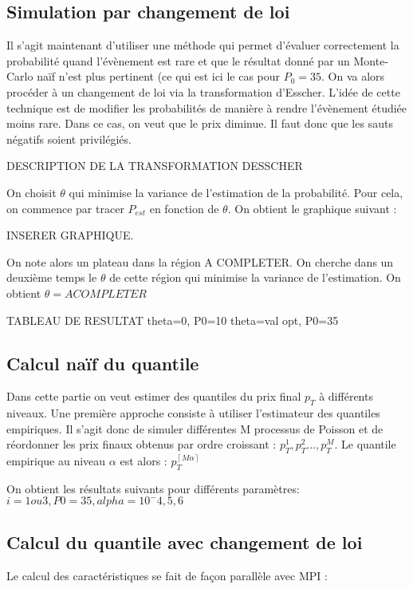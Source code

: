 \documentclass[a4paper,11pt]{article}
\begin{document}
\subsection{Simulation par changement de loi}

Il s'agit maintenant d'utiliser une méthode qui permet d'évaluer correctement la probabilité quand l'évènement est rare et que le résultat donné par un Monte-Carlo naïf n'est plus pertinent (ce qui est ici le cas pour $P_{0}=35$. On va alors procéder à un changement de loi via la transformation d'Esscher. L'idée de cette technique est de modifier les probabilités de manière à rendre l'évènement étudiée moins rare. Dans ce cas, on veut que le prix diminue. Il faut donc que les sauts négatifs soient privilégiés. 

DESCRIPTION DE LA TRANSFORMATION DESSCHER

On choisit $\theta$ qui minimise la variance de l'estimation de la probabilité. Pour cela, on commence par tracer $P_{est}$ en fonction de $\theta$. On obtient le graphique suivant :

INSERER GRAPHIQUE.

On note alors un plateau dans la région A COMPLETER. On cherche dans un deuxième temps le $\theta$ de cette région qui minimise la variance de l'estimation. 
On obtient $\theta= A COMPLETER$

TABLEAU DE RESULTAT
theta=0, P0=10
theta=val opt, P0=35

\subsection{Calcul naïf du quantile}
Dans cette partie on veut estimer des quantiles du prix final $p_{T}$ à différents niveaux. Une première approche consiste à utiliser l'estimateur des quantiles empiriques. Il s'agit donc de simuler différentes M processus de Poisson et de réordonner les prix finaux obtenus par ordre croissant : $p_{T}^{1}, p_{T}^{2}..., p_{T}^{M}$. Le quantile empirique au niveau $\alpha$ est alors : $p_{T}^{\left \lceil M\alpha  \right \rceil} $

On obtient les résultats suivants pour différents paramètres:
$i=1 ou 3, P0=35, alpha=10^-4, 5, 6
$
\subsection{Calcul du quantile avec changement de loi}




Le calcul des caractéristiques se fait de façon parallèle avec MPI :\\
\end{document}
